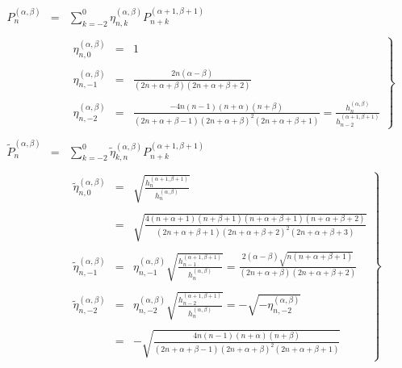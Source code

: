 \begin{eqnarray}
  P_n^{(\alpha, \beta)} & = & \sum_{k = - 2}^0 \eta_{n, k}^{(\alpha, \beta)}
  P_{n + k}^{(\alpha + 1, \beta + 1)}  \label{eq:jacform-abp}\\
  &  &  \nonumber\\
  &  & \left. \begin{array}{lll}
    \eta_{n, 0}^{(\alpha, \beta)} & = & 1\\
    &  & \\
    \eta_{n, - 1}^{(\alpha, \beta)} & = & \frac{2 n (\alpha - \beta)}{(2 n +
    \alpha + \beta) (2 n + \alpha + \beta + 2)}\\
    &  & \\
    \eta_{n, - 2}^{(\alpha, \beta)} & = & \frac{- 4 n (n - 1) (n + \alpha) (n
    + \beta)}{(2 n + \alpha + \beta - 1) (2 n + \alpha + \beta)^2 (2 n +
    \alpha + \beta + 1)} = \frac{h_n^{(\alpha, \beta)}}{h_{n - 2}^{(\alpha +
    1, \beta + 1)}}
  \end{array}  \right\}  \label{eq:jacform-etadef}\\
  &  &  \nonumber\\
  \tilde{P}_n^{(\alpha, \beta)} & = & \sum_{k = - 2}^0 \tilde{\eta}^{(\alpha,
  \beta)}_{k, n} P_{n + k}^{(\alpha + 1, \beta + 1)} 
  \label{eq:jacform-abpn}\\
  &  &  \nonumber\\
  &  & \left. \begin{array}{lll}
    \tilde{\eta}_{n, 0}^{(\alpha, \beta)} & = & \sqrt{\frac{h_n^{(\alpha + 1,
    \beta + 1)}}{h_n^{(\alpha, \beta)}}}\\
    &  & \\
    & = & \sqrt{\frac{4 (n + \alpha + 1) (n + \beta + 1) (n + \alpha + \beta
    + 1) (n + \alpha + \beta + 2)}{(2 n + \alpha + \beta + 1) (2 n + \alpha +
    \beta + 2)^2 (2 n + \alpha + \beta + 3)}}\\
    &  & \\
    \tilde{\eta}_{n, - 1}^{(\alpha, \beta)} & = & \eta_{n, - 1}^{(\alpha,
    \beta)}  \sqrt{\frac{h_{n - 1}^{(\alpha + 1, \beta + 1)}}{h_n^{(\alpha,
    \beta)}}} = \frac{2 (\alpha - \beta) \sqrt{n (n + \alpha + \beta + 1)}}{(2
    n + \alpha + \beta) (2 n + \alpha + \beta + 2)}\\
    &  & \\
    \tilde{\eta}_{n, - 2}^{(\alpha, \beta)} & = & \eta_{n, - 2}^{(\alpha,
    \beta)}  \sqrt{\frac{h_{n - 2}^{(\alpha + 1, \beta + 1)}}{h_n^{(\alpha,
    \beta)}}} = - \sqrt{- \eta_{n, - 2}^{(\alpha, \beta)}}\\
    &  & \\
    & = & - \sqrt{\frac{4 n (n - 1) (n + \alpha) (n + \beta)}{(2 n + \alpha +
    \beta - 1) (2 n + \alpha + \beta)^2 (2 n + \alpha + \beta + 1)}}
  \end{array} \right\}  \label{eq:jacform-etatildedef}
\end{eqnarray}
